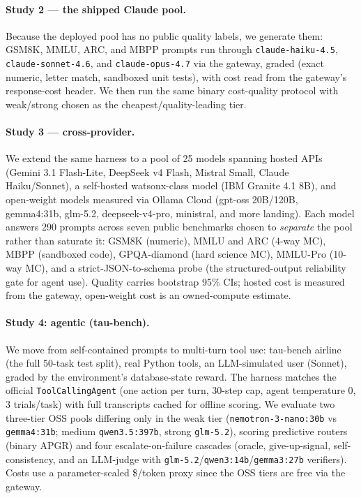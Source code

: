 \documentclass[11pt]{article}
\newcommand{\code}[1]{\texttt{\small #1}}
\newcommand{\NPROV}{25}            %
\newcommand{\NPROMPTS}{290}        %
\newcommand{\TAUN}{50}
\begin{document}
\paragraph{Study 2 --- the shipped Claude pool.} Because the deployed pool has no public
quality labels, we generate them: GSM8K, MMLU, ARC, and MBPP prompts run through
\code{claude-haiku-4.5}, \code{claude-sonnet-4.6}, and \code{claude-opus-4.7} via the
gateway, graded (exact numeric, letter match, sandboxed unit tests), with cost read from
the gateway's response-cost header. We then run the same binary cost-quality protocol
with weak/strong chosen as the cheapest/quality-leading tier.
\paragraph{Study 3 --- cross-provider.} We extend the same harness to a pool of \NPROV{}
models spanning hosted APIs (Gemini 3.1 Flash-Lite, DeepSeek v4 Flash, Mistral Small,
Claude Haiku/Sonnet), a self-hosted watsonx-class model (IBM Granite 4.1 8B), and
open-weight models measured via Ollama Cloud (gpt-oss 20B/120B, gemma4:31b, glm-5.2,
deepseek-v4-pro, ministral, and more landing). Each model answers \NPROMPTS{} prompts
across seven public benchmarks chosen to \emph{separate} the pool rather than saturate
it: GSM8K (numeric), MMLU and ARC (4-way MC), MBPP (sandboxed code), GPQA-diamond (hard
science MC), MMLU-Pro (10-way MC), and a strict-JSON-to-schema probe (the structured-output
reliability gate for agent use). Quality carries bootstrap 95\% CIs; hosted cost is
measured from the gateway, open-weight cost is an owned-compute estimate.
\paragraph{Study 4: agentic (tau-bench).} We move from self-contained prompts to multi-turn
tool use: tau-bench airline (the full \TAUN{}-task test split), real Python tools, an
LLM-simulated user (Sonnet), graded by the environment's database-state reward. The harness
matches the official \code{ToolCallingAgent} (one action per turn, 30-step cap, agent temperature
0, 3 trials/task) with full transcripts cached for offline scoring. We evaluate two three-tier OSS
pools differing only in the weak tier (\code{nemotron-3-nano:30b} vs \code{gemma4:31b}; medium
\code{qwen3.5:397b}, strong \code{glm-5.2}), scoring predictive routers (binary APGR) and four
escalate-on-failure cascades (oracle, give-up-signal, self-consistency, and an LLM-judge with
\code{glm-5.2}/\code{qwen3:14b}/\code{gemma3:27b} verifiers). Costs use a parameter-scaled \$/token
proxy since the OSS tiers are free via the gateway.
\end{document}
